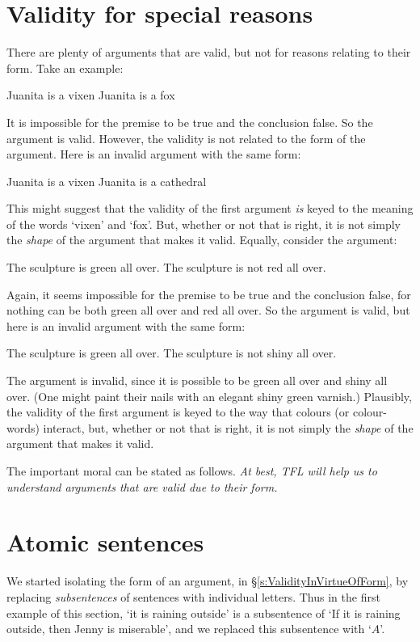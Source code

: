 \section{Validity for special reasons}
There are plenty of arguments that are valid, but not for reasons relating to their form. Take an example:
	\begin{earg}
		\prem Juanita is a vixen
		\conc Juanita is a fox
	\end{earg}
It is impossible for the premise to be true and the conclusion false. So the argument is valid. However, the validity is not related to the form of the argument. Here is an invalid argument with the same form:
	\begin{earg}
		\prem Juanita is a vixen
		\conc Juanita is a cathedral
	\end{earg}
This might suggest that the validity of the first argument \emph{is} keyed to the meaning of the words `vixen' and `fox'. But, whether or not that is right, it is not simply the \emph{shape} of the argument that makes it valid. Equally, consider the argument:
	\begin{earg}
		\prem The sculpture is green all over.
		\conc The sculpture is not red all over.
	\end{earg}
Again, it seems impossible for the premise to be true and the conclusion false, for nothing can be both green all over and red all over. So the argument is valid, but here is an invalid argument with the same form:
	\begin{earg}
		\prem The sculpture is green all over.
		\conc The sculpture is not shiny all over.
	\end{earg}
The argument is invalid, since it is possible to be green all over and shiny all over. (One might paint their nails with an elegant shiny green varnish.) Plausibly, the validity of the first argument is keyed to the way that colours (or colour-words) interact, but, whether or not that is right, it is not simply the \emph{shape} of the argument that makes it valid.

The important moral can be stated as follows. \emph{At best, TFL will help us to understand arguments that are valid due to their form.}

\section{Atomic sentences}

We started isolating the form of an argument, in \S\ref{s:ValidityInVirtueOfForm}, by replacing  \emph{subsentences} of sentences with individual letters. Thus in the first example of this section, `it is raining outside' is a subsentence of `If it is raining outside, then Jenny is miserable', and we replaced this subsentence with `$A$'.


